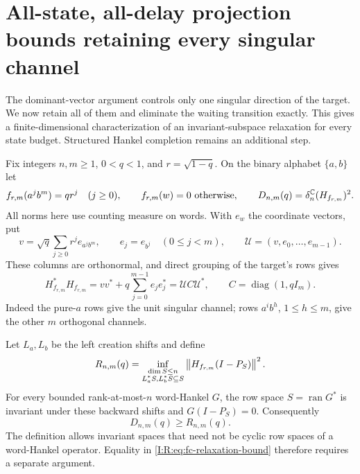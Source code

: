 


\section{All-state, all-delay projection bounds retaining every singular channel}
\label{I:R:sec:full-channel}

The dominant-vector argument controls only one singular direction of the target.
We now retain all of them and eliminate the waiting transition exactly. This
gives a finite-dimensional characterization of an invariant-subspace relaxation
for every state budget. Structured Hankel completion remains an additional step.

Fix integers $n,m\ge1$, $0<q<1$, and $r=\sqrt{1-q}$. On the binary alphabet
$\{a,b\}$ let
\[
 f_{r,m}(a^j b^m)=qr^j\quad(j\ge0),\qquad
 f_{r,m}(w)=0\text{ otherwise},\qquad
 D_{n,m}(q)=\delta_n^{\mathbb C}(H_{f_{r,m}})^2.
\]
All norms here use counting measure on words. With $e_w$ the coordinate vectors,
put
\[
 v=\sqrt q\sum_{j\ge0}r^j e_{a^j b^m},\qquad
 e_j=e_{b^j}\quad(0\le j<m),\qquad
 \mathcal U=(v,e_0,\ldots,e_{m-1}).
\]
These columns are orthonormal, and direct grouping of the target's rows gives
\begin{equation}
 H_{f_{r,m}}^*H_{f_{r,m}}
   =vv^*+q\sum_{j=0}^{m-1}e_je_j^*
   =\mathcal U C\mathcal U^*,\qquad C=\operatorname{diag}(1,qI_m).
 \label{I:R:eq:fc-singular}
\end{equation}
Indeed the pure-$a$ rows give the unit singular channel; rows $a^i b^h$,
$1\le h\le m$, give the other $m$ orthogonal channels.

Let $L_a,L_b$ be the left creation shifts and define
\begin{equation}
 R_{n,m}(q)=\inf_{\substack{\dim S\le n\\L_a^*S,L_b^*S\subseteq S}}
          \left\lVert H_{f_{r,m}}(I-P_S)\right\rVert^2.
 \label{I:R:eq:fc-relaxation}
\end{equation}
For every bounded rank-at-most-$n$ word-Hankel $G$, the row space
$S=\operatorname{ran}G^*$ is invariant under these backward shifts and
$G(I-P_S)=0$. Consequently
\begin{equation}
 D_{n,m}(q)\ge R_{n,m}(q).
 \label{I:R:eq:fc-relaxation-bound}
\end{equation}
The definition allows invariant spaces that need not be cyclic row spaces of a
word-Hankel operator. Equality in \eqref{I:R:eq:fc-relaxation-bound} therefore
requires a separate argument.

